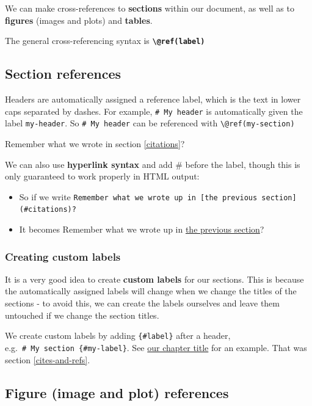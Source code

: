 \documentclass[a4paper, twoside]{templates/ociamthesis}
\providecommand{\tightlist}{%
  \setlength{\itemsep}{0pt}\setlength{\parskip}{0pt}}
\theoremstyle{definition}
\theoremstyle{definition}
\theoremstyle{definition}
\theoremstyle{definition}
\theoremstyle{remark}
\begin{document}
We can make cross-references to \textbf{sections} within our document, as well as to \textbf{figures} (images and plots) and \textbf{tables}.

The general cross-referencing syntax is \textbf{\texttt{\textbackslash{}@ref(label)}}

\hypertarget{section-references}{%
\subsection{Section references}\label{section-references}}

Headers are automatically assigned a reference label, which is the text in lower caps separated by dashes. For example, \texttt{\#\ My\ header} is automatically given the label \texttt{my-header}. So \texttt{\#\ My\ header} can be referenced with \texttt{\textbackslash{}@ref(my-section)}

Remember what we wrote in section \ref{citations}?

We can also use \textbf{hyperlink syntax} and add \# before the label, though this is only guaranteed to work properly in HTML output:

\begin{itemize}
\tightlist
\item
  So if we write \texttt{Remember\ what\ we\ wrote\ up\ in\ {[}the\ previous\ section{]}(\#citations)?}
\item
  It becomes Remember what we wrote up in \protect\hyperlink{citations}{the previous section}?
\end{itemize}

\hypertarget{creating-custom-labels}{%
\subsubsection{Creating custom labels}\label{creating-custom-labels}}

It is a very good idea to create \textbf{custom labels} for our sections. This is because the automatically assigned labels will change when we change the titles of the sections - to avoid this, we can create the labels ourselves and leave them untouched if we change the section titles.

We create custom labels by adding \texttt{\{\#label\}} after a header, e.g.~\texttt{\#\ My\ section\ \{\#my-label\}}.
See \protect\hyperlink{cites-and-refs}{our chapter title} for an example. That was section \ref{cites-and-refs}.

\hypertarget{figure-image-and-plot-references}{%
\subsection{Figure (image and plot) references}\label{figure-image-and-plot-references}}
\end{document}
